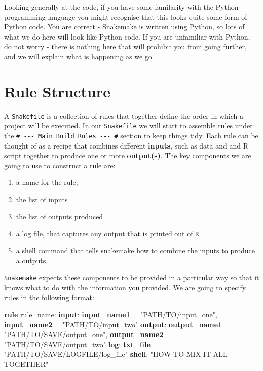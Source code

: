 \documentclass[]{book}
\newenvironment{Shaded}{\begin{snugshade}}{\end{snugshade}}
\newcommand{\KeywordTok}[1]{\textcolor[rgb]{0.13,0.29,0.53}{\textbf{{#1}}}}
\newcommand{\StringTok}[1]{\textcolor[rgb]{0.31,0.60,0.02}{{#1}}}
\newcommand{\NormalTok}[1]{{#1}}
\providecommand{\tightlist}{%
  \setlength{\itemsep}{0pt}\setlength{\parskip}{0pt}}
\theoremstyle{definition}
\theoremstyle{definition}
\theoremstyle{definition}
\theoremstyle{remark}
\begin{document}
Looking generally at the code, if you have some familarity with the
Python programming language you might recognise that this looks quite
some form of Python code. You are correct - Snakemake is written using
Python, so lots of what we do here will look like Python code. If you
are unfamiliar with Python, do not worry - there is nothing here that
will prohibit you from going further, and we will explain what is
happening as we go.

\section{Rule Structure}\label{rule-structure}

A \texttt{Snakefile} is a collection of rules that together define the
order in which a project will be executed. In our \texttt{Snakefile} we
will start to assemble rules under the
\texttt{\#\ -\/-\/-\ Main\ Build\ Rules\ -\/-\/-\ \#} section to keep
things tidy. Each rule can be thought of as a recipe that combines
different \textbf{inputs}, such as data and and R script together to
produce one or more \textbf{output(s)}. The key components we are going
to use to construct a rule are:

\begin{enumerate}
\def\labelenumi{(\roman{enumi})}
\tightlist
\item
  a name for the rule,
\item
  the list of inputs
\item
  the list of outputs produced
\item
  a log file, that captures any output that is printed out of \texttt{R}
\item
  a shell command that tells snakemake how to combine the inputs to
  produce a outputs.
\end{enumerate}

\texttt{Snakemake} expects these components to be provided in a
particular way so that it knows what to do with the information you
provided. We are going to specify rules in the following format:

\begin{Shaded}
\begin{Highlighting}[]
\KeywordTok{rule} \NormalTok{rule_name:}
    \KeywordTok{input}\NormalTok{:}
        \KeywordTok{input_name1} \NormalTok{= }\StringTok{"PATH/TO/input_one"}\NormalTok{,}
        \KeywordTok{input_name2} \NormalTok{= }\StringTok{"PATH/TO/input_two"}
    \KeywordTok{output}\NormalTok{:}
        \KeywordTok{output_name1} \NormalTok{= }\StringTok{"PATH/TO/SAVE/output_one"}\NormalTok{,}
        \KeywordTok{output_name2} \NormalTok{= }\StringTok{"PATH/TO/SAVE/output_two"}
    \KeywordTok{log}\NormalTok{:}
        \KeywordTok{txt_file} \NormalTok{= }\StringTok{"PATH/TO/SAVE/LOGFILE/log_file"}
    \KeywordTok{shell}\NormalTok{:}
        \StringTok{"HOW TO MIX IT ALL TOGETHER"}
\end{Highlighting}
\end{Shaded}
\end{document}
